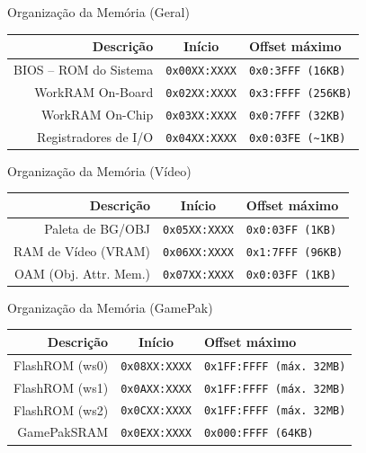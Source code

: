 \documentclass{beamer}
\begin{document}
\begin{darkframes}
\begin{frame}{Organização da Memória (Geral)}
    \begin{center}
        \begin{tabular}{|r|c|l|}
            \hline
            Descrição              & Início               & Offset máximo \\\hline
            BIOS -- ROM do Sistema & \texttt{0x00XX:XXXX} & \texttt{0x0:3FFF (16KB)} \\\hline
            WorkRAM On-Board       & \texttt{0x02XX:XXXX} & \texttt{0x3:FFFF (256KB)} \\\hline
            WorkRAM On-Chip        & \texttt{0x03XX:XXXX} & \texttt{0x0:7FFF (32KB)} \\\hline
            Registradores de I/O   & \texttt{0x04XX:XXXX} & \texttt{0x0:03FE (\textasciitilde1KB)} \\\hline
        \end{tabular}
    \end{center}
\end{frame}

\begin{frame}{Organização da Memória (Vídeo)}
    \begin{center}
        \begin{tabular}{|r|c|l|}
            \hline
            Descrição             & Início               & Offset máximo \\\hline
            Paleta de BG/OBJ      & \texttt{0x05XX:XXXX} & \texttt{0x0:03FF (1KB)} \\\hline
            RAM de Vídeo (VRAM)   & \texttt{0x06XX:XXXX} & \texttt{0x1:7FFF (96KB)} \\\hline
            OAM (Obj. Attr. Mem.) & \texttt{0x07XX:XXXX} & \texttt{0x0:03FF (1KB)} \\\hline
        \end{tabular}
    \end{center}
\end{frame}

\begin{frame}{Organização da Memória (GamePak)}
    \begin{center}
        \begin{tabular}{|r|c|l|}
            \hline
            Descrição      & Início               & Offset máximo \\\hline
            FlashROM (ws0) & \texttt{0x08XX:XXXX} & \texttt{0x1FF:FFFF (máx. 32MB)} \\\hline
            FlashROM (ws1) & \texttt{0x0AXX:XXXX} & \texttt{0x1FF:FFFF (máx. 32MB)} \\\hline
            FlashROM (ws2) & \texttt{0x0CXX:XXXX} & \texttt{0x1FF:FFFF (máx. 32MB)} \\\hline
            GamePakSRAM    & \texttt{0x0EXX:XXXX} & \texttt{0x000:FFFF (64KB)} \\\hline
        \end{tabular}
    \end{center}
\end{frame}


\end{darkframes}
\end{document}
